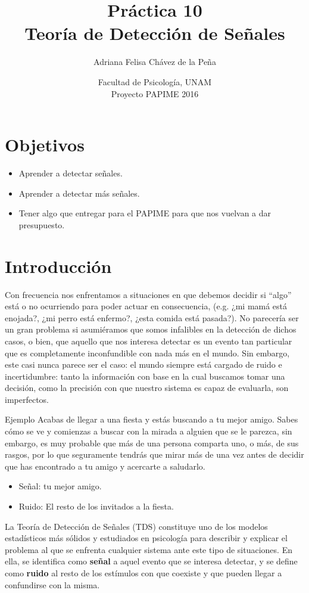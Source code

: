 \documentclass[letterpaper,12pt]{article}
\title{Práctica 10  \\ Teoría de Detección de Señales}
\author{Adriana Felisa Chávez de la Peña}
\date{Facultad de Psicología, UNAM \\Proyecto PAPIME 2016}
\begin{document}
\renewcommand{\tablename}{Tabla}
\maketitle
\section*{Objetivos}
\begin{itemize}
\item Aprender a detectar señales.
\item Aprender a detectar más señales.
\item Tener algo que entregar para el PAPIME para que nos vuelvan a dar presupuesto.
\end{itemize}

\section{Introducción}
Con frecuencia nos enfrentamos a situaciones en que debemos decidir si ``algo'' está o no ocurriendo para poder actuar en consecuencia, (e.g. ¿mi mamá está enojada?, ¿mi perro está enfermo?, ¿esta comida está pasada?). No parecería ser un gran problema si asumiéramos que somos infalibles en la detección de dichos casos, o bien, que aquello que nos interesa detectar es un evento tan particular que es completamente inconfundible con nada más en el mundo. Sin embargo, este casi nunca parece ser el caso: el mundo siempre está cargado de ruido e incertidumbre: tanto la información con base en la cual buscamos tomar una decisión, como la precisión con que nuestro sistema es capaz de evaluarla, son imperfectos. 
\begin{bclogo}[logo=\bccoeur,couleur=blue!10,arrondi=0.1,marge=10,barre=none]{Ejemplo}
Acabas de llegar a una fiesta y estás buscando a tu mejor amigo. Sabes cómo se ve y comienzas a buscar con la mirada a alguien que se le parezca, sin embargo, es muy probable que más de una persona comparta uno, o más, de sus rasgos, por lo que seguramente tendrás que mirar más de una vez antes de decidir que has encontrado a tu amigo y acercarte a saludarlo.
\begin{itemize}
\item Señal: tu mejor amigo.
\item Ruido: El resto de los invitados a la fiesta.
\end{itemize}
\end{bclogo}
La Teoría de Detección de Señales (TDS) constituye uno de los modelos estadísticos más sólidos y estudiados en psicología para describir y explicar el problema al que se enfrenta cualquier sistema ante este tipo de situaciones. En ella, se identifica como \textbf{señal} a aquel evento que se interesa detectar, y se define como \textbf{ruido} al resto de los estímulos con que coexiste y que pueden llegar a confundirse con la misma. 
\end{document}
